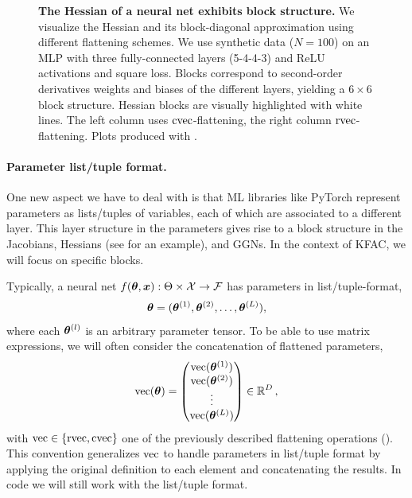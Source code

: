 \begin{figure}[!h]
\begin{minipage}[t]{0.495\linewidth}
  \end{minipage}
  \caption{\textbf{The Hessian of a neural net exhibits block structure.}
    We visualize the Hessian and its block-diagonal approximation using different flattening schemes.
    We use synthetic data ($N=100$) on an MLP with three fully-connected layers (5-4-4-3) and ReLU activations and square loss.
    Blocks correspond to second-order derivatives \wrt weights and biases of the different layers, yielding a $6 \times 6$ block structure.
    Hessian blocks are visually highlighted with white lines.
    The left column uses $\cvec$-flattening, the right column $\rvec$-flattening.
    Plots produced with .
  }\label{fig:hessian-block-structure}
\end{figure}
\switchcolumn[0]

\paragraph{Parameter list/tuple format.} One new aspect we have to deal with is that ML libraries like PyTorch represent parameters as lists/tuples of variables, each of which are associated to a different layer.
This layer structure in the parameters gives rise to a block structure in the Jacobians, Hessians (see  for an example), and GGNs.
In the context of KFAC, we will focus on specific blocks.

Typically, a neural net $f(\vtheta, \vx): \Theta \times \gX \to \gF$ has parameters in list/tuple-format,
\begin{align*}
  \vtheta = (\vtheta^{(1)}, \vtheta^{(2)}, \ldots, \vtheta^{(L)}),
\end{align*}
where each $\vtheta^{(l)}$ is an arbitrary parameter tensor.
To be able to use matrix expressions, we will often consider the concatenation of flattened parameters,
\begin{align*}
  \vec(\vtheta)
  =
  \begin{pmatrix}
    \vec(\vtheta^{(1)}) \\
    \vec(\vtheta^{(2)}) \\
    \vdots              \\
    \vec(\vtheta^{(L)})
  \end{pmatrix}
  \in \sR^D
  \,,
\end{align*}
with $\vec \in \{ \rvec, \cvec \}$ one of the previously described flattening operations ().
This convention generalizes $\vec$ to handle parameters in list/tuple format by applying the original definition to each element and concatenating the results.
In code we will still work with the list/tuple format.

